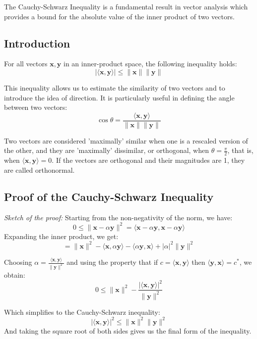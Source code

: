 The Cauchy-Schwarz Inequality is a fundamental result in vector analysis which provides a bound for the absolute value of the inner product of two vectors.

\subsection{Introduction}
For all vectors \( \mathbf{x}, \mathbf{y} \) in an inner-product space, the following inequality holds:
\[ |\langle \mathbf{x}, \mathbf{y} \rangle| \leq \|\mathbf{x}\| \|\mathbf{y}\| \]


This inequality allows us to estimate the similarity of two vectors and to introduce the idea of direction. It is particularly useful in defining the angle between two vectors:
\[ \cos \theta = \frac{\langle \mathbf{x}, \mathbf{y} \rangle}{\|\mathbf{x}\| \|\mathbf{y}\|} \]

Two vectors are considered 'maximally' similar when one is a rescaled version of the other, and they are 'maximally' dissimilar, or orthogonal, when \( \theta = \frac{\pi}{2} \), that is, when \( \langle \mathbf{x}, \mathbf{y} \rangle = 0 \). If the vectors are orthogonal and their magnitudes are 1, they are called orthonormal.

\subsection{Proof of the Cauchy-Schwarz Inequality}

\textit{Sketch of the proof:}
Starting from the non-negativity of the norm, we have:
\[ 0 \leq \|\mathbf{x} - \alpha \mathbf{y}\|^2 = \langle \mathbf{x} - \alpha \mathbf{y}, \mathbf{x} - \alpha \mathbf{y} \rangle \]
Expanding the inner product, we get:
\[ = \|\mathbf{x}\|^2 - \langle \mathbf{x}, \alpha \mathbf{y} \rangle - \langle \alpha \mathbf{y}, \mathbf{x} \rangle + |\alpha|^2 \|\mathbf{y}\|^2 \]

Choosing \( \alpha = \frac{\langle \mathbf{x}, \mathbf{y} \rangle}{\|\mathbf{y}\|^2} \) and using the property that if \( c = \langle \mathbf{x}, \mathbf{y} \rangle \) then \( \langle \mathbf{y}, \mathbf{x} \rangle = c^* \), we obtain:
\[ 0 \leq \|\mathbf{x}\|^2 - \frac{|\langle \mathbf{x}, \mathbf{y} \rangle|^2}{\|\mathbf{y}\|^2} \]

Which simplifies to the Cauchy-Schwarz inequality:
\[ |\langle \mathbf{x}, \mathbf{y} \rangle|^2 \leq \|\mathbf{x}\|^2 \|\mathbf{y}\|^2 \]
And taking the square root of both sides gives us the final form of the inequality.

